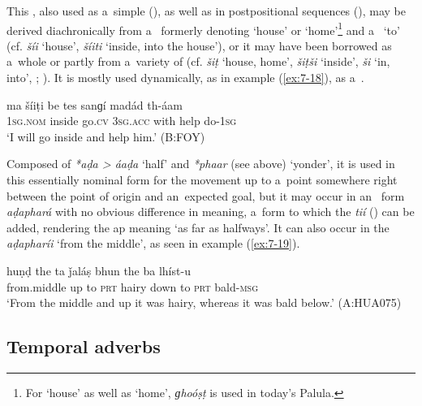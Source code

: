  This , also used as a~simple 
(), as well as in postpositional sequences (), may be derived diachronically from
a~ formerly denoting `house' or `home'\footnote{For `house' as well as `home',
  \textit{ɡhoóṣṭ} is used in today's Palula.} and a~ `to' (cf. 
\textit{šíi} `house', \textit{šíiti} `inside, into the house'), or it may have been borrowed
as a~whole or partly from a~variety of  (cf.  \textit{šiṭ} `house, home',
\textit{šiṭši} `inside', \textit{ši} `in, into', \citealt[119]{baart1997}; \citeyear[76]{baart1999a}). It is mostly used
dynamically, as in example (\ref{ex:7-18}), as a~.

\begin{exe}
\ex
\label{ex:7-18}
\gll ma šíiṭi be tes sanɡí madád th-áam \\
\textsc{1sg.nom} inside go.\textsc{cv} \textsc{3sg.acc} with help do-\textsc{1sg}\\
\glt `I will go inside and help him.' (B:FOY)
\end{exe}

 Composed of \textit{*aḍa {\textgreater} áaḍa} `half' and \textit{*phaar} (see above) `yonder', it is used in this essentially nominal form for the movement up to a~point somewhere right between the point of origin and an~expected goal, but it may occur in an~ form \textit{aḍaphará} with no obvious difference in meaning, a~form to which the  \textit{tií} () can be added, rendering the ap meaning `as far as halfways'. It can also occur in the  \textit{aḍapharíi} `from the middle', as seen in example (\ref{ex:7-19}). 
\begin{exe}
\ex
\label{ex:7-19}
\gll [aḍapharíi] huṇḍ the ta ǰaláṣ bhun the  ba lhíst-u \\
from.middle up to \textsc{prt} hairy down  to \textsc{prt} bald-\textsc{msg}\\
\glt `From the middle and up it was hairy, whereas it was bald below.' (A:HUA075)
\end{exe}

\subsection{Temporal adverbs}
\label{subsec:7-1-3}

